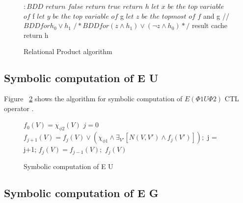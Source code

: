 \begin{figure}[H]
\begin{framed}
\begin{algorithmic}[1]
$:BDD$
 \State $return$ $false$
 \State $return$ $true$
 \State $return$ $h$
\Else
 \State $let$ $x$ $be$ $the$ $top$ $variable$ $of$ f
 \State $let$ $y$ $be$ $the$ $top$ $variable$ $of$ g
 \State $let$ $z$ $be$ $the$ $topmost$  $of$ $f$ and g
   //$BDD for h_0 \lor h_1$
 \Else
  \State $      /*BDD for (z\land h_1) \lor (\neg z\land h_0)*/$
 \EndIf
  result cache
 \State return h
\EndIf
\EndProcedure
\end{algorithmic}
\end{framed}
\caption{Relational Product algorithm}
\label{Relational Product algorithm}
\end{figure}

\subsection*{Symbolic computation of E U}

Figure ~\ref{Symbolic computation of E U} shows the algorithm for symbolic computation of $E (\Phi 1 U \Phi 2)$ CTL operator \cite{Baier 2008}.   

\begin{figure}[H]
\begin{framed}
\begin{algorithmic}[1]
\State $f_0(V) = \chi_{\phi 2}(V)$
\State $j = 0$
\Repeat
\State $f_{j+1}(V) = f_j(V) \lor (\chi_{\phi 1} \land \exists_{V'}[N(V,V')\land f_j(V')]);$
\State j = j+1;
\Until  $f_j(V) = f_{j-1}(V);$
\State
\Return $f_j(V)$

\EndProcedure
\end{algorithmic}
\end{framed}
\caption{Symbolic computation of E U}
\label{Symbolic computation of E U}
\end{figure}


\subsection*{Symbolic computation of E G}

